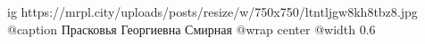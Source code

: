  
 
 
 
 

\ifcmt
  ig https://mrpl.city/uploads/posts/resize/w/750x750/ltntljgw8kh8tbz8.jpg
	@caption Прасковья Георгиевна Смирная
  @wrap center
  @width 0.6
\fi
